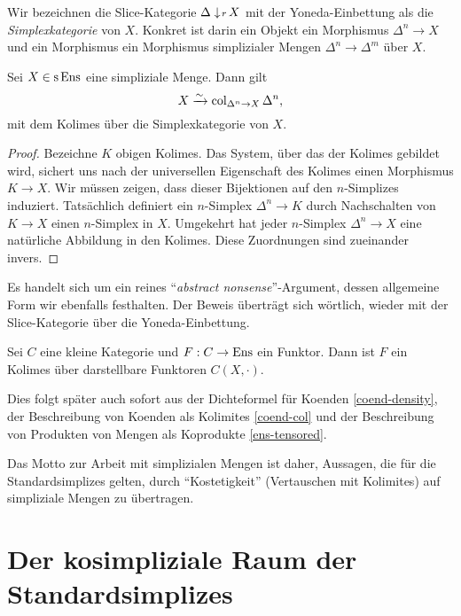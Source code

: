 Wir bezeichnen die Slice-Kategorie $\Delta \downarrow \! {\scriptstyle r} \, X$ mit der
Yoneda-Einbettung als die \emph{Simplexkategorie} von $X$. Konkret ist
darin ein Objekt ein Morphismus $\Delta^n \to X$ und ein Morphismus
ein Morphismus simplizialer Mengen $\Delta^n \to \Delta^m$ über $X$.
\begin{lemma}[\cite{GJ}, I.2.1] \label{sset-col}
  Sei $X \in \operatorname{s}\operatorname{Ens}$ eine simpliziale Menge. Dann gilt
  \[ X \xrightarrow[]{\sim} \operatorname{col}_{\Delta^n \to X} \Delta^n, \]
  mit dem Kolimes über die Simplexkategorie von $X$.
\end{lemma}
\begin{proof}
  Bezeichne $K$ obigen Kolimes. Das System, über das der Kolimes
  gebildet wird, sichert uns nach der universellen Eigenschaft des
  Kolimes einen Morphismus $K \to X$. Wir müssen zeigen, dass dieser
  Bijektionen auf den $n$-Simplizes induziert. Tatsächlich definiert
  ein $n$-Simplex $\Delta^n \to K$ durch Nachschalten von $K \to X$
  einen $n$-Simplex in $X$. Umgekehrt hat jeder $n$-Simplex $\Delta^n
  \to X$ eine natürliche Abbildung in den Kolimes. Diese Zuordnungen
  sind zueinander invers.
\end{proof}
Es handelt sich um ein reines ``\emph{abstract nonsense}''-Argument,
dessen allgemeine Form wir ebenfalls festhalten. Der Beweis überträgt
sich wörtlich, wieder mit der Slice-Kategorie über die
Yoneda-Einbettung.
\begin{prop}[\cite{GJ}, I.2.1] \label{presheaf-colimit-representable}
  Sei $C$ eine kleine Kategorie und $F: C \to \operatorname{Ens}$ ein Funktor. Dann
  ist $F$ ein Kolimes über darstellbare Funktoren $C(X, \cdot)$.
\end{prop}
\begin{bem}
  Dies folgt später auch sofort aus der Dichteformel für Koenden
  \ref{coend-density}, der Beschreibung von Koenden als Kolimites
  \ref{coend-col} und der Beschreibung von Produkten von Mengen als
  Koprodukte \ref{ens-tensored}.
\end{bem}
Das Motto zur Arbeit mit simplizialen Mengen ist daher, Aussagen, die
für die Standardsimplizes gelten, durch ``Kostetigkeit'' (Vertauschen
mit Kolimites) auf simpliziale Mengen zu übertragen.

\section[Der kosimpliziale Raum der Standardsimplizes]
  {\texorpdfstring{Der kosimpliziale Raum der\\Standardsimplizes}
    {Der kosimpliziale Raum der Standardsimplizes}}

